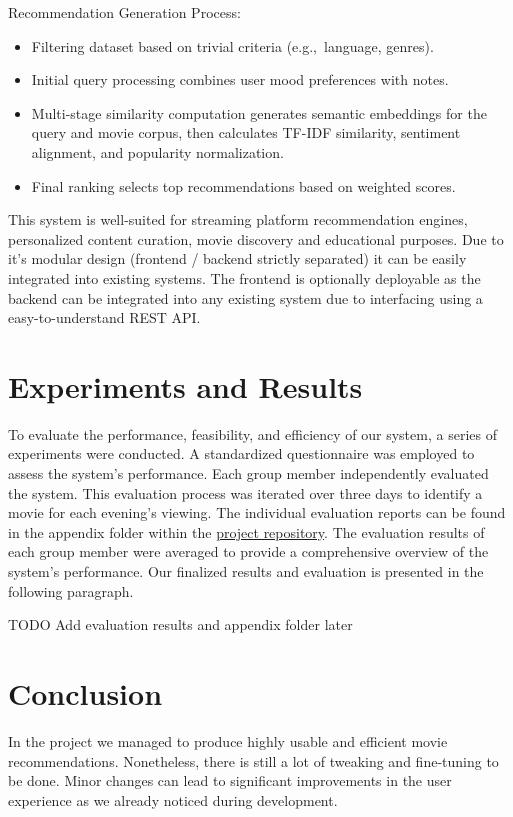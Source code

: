 \documentclass[12pt,a4paper]{article}
\begin{document}
  \noindent Recommendation Generation Process:
  \begin{itemize}
    \item Filtering dataset based on trivial criteria (e.g.,\ language, genres).
    \item Initial query processing combines user mood preferences with notes.
    \item Multi-stage similarity computation generates semantic embeddings for the query and movie corpus, then calculates TF-IDF similarity, sentiment alignment, and popularity normalization.
    \item Final ranking selects top recommendations based on weighted scores.
  \end{itemize}

  \noindent This system is well-suited for streaming platform recommendation engines, personalized content curation, movie discovery
  and educational purposes.
  Due to it's modular design (frontend / backend strictly separated) it can be easily integrated into existing systems.
  The frontend is optionally deployable as the backend can be integrated into any existing system due to interfacing
  using a easy-to-understand REST API.


  \section{Experiments and Results}

  To evaluate the performance, feasibility, and efficiency of our system, a series of experiments were conducted.
  A standardized questionnaire was employed to assess the system’s performance.
  Each group member independently evaluated the system.
  This evaluation process was iterated over three days to identify a movie for each evening’s viewing.
  The individual evaluation reports can be found in the appendix folder within the
  \href{https://github.com/IImpaq/air-2024/appendix}{project repository}.
  The evaluation results of each group member were averaged to provide a comprehensive overview of the system’s performance.
  Our finalized results and evaluation is presented in the following paragraph.

  \noindent TODO Add evaluation results and appendix folder later

  \section{Conclusion}

  In the project we managed to produce highly usable and efficient movie recommendations.
  Nonetheless, there is still a lot of tweaking and fine-tuning to be done.
  Minor changes can lead to significant improvements in the user experience as we already noticed during development.

  \printbibliography
\end{document}
